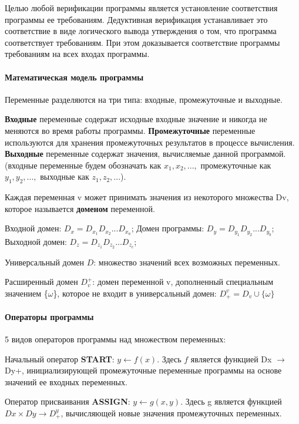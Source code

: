 
Целью любой верификации программы является установление соответствия программы ее требованиям. Дедуктивная верификация устанавливает это соответствие в виде логического вывода утверждения о том, что программа соответствует требованиям. При этом доказывается соответствие программы требованиям на всех входах программы.
\paragraph{Математическая модель программы}

Переменные разделяются на три типа: входные, промежуточные и выходные.

\textbf{Входные} переменные содержат исходные входные значение и никогда не меняются во время работы программы. \textbf{Промежуточные} переменные используются для хранения промежуточных результатов в процессе вычисления. \textbf{Выходные} переменные содержат значения, вычисляемые данной программой.(входные переменные будем обозначать как $x_1, x_2, ...,$ промежуточные как $y_1, y_2, ...,$ выходные как $z_1, z_2, ...$).

Каждая переменная v может принимать значения из некоторого множества Dv, которое называется \textbf{доменом} переменной.

Входной домен: $D_x = D_{x_1}  D_{x_2}  ...  D_{x_a}$; Домен программы: $D_y = D_{y_1}  D_{y_2}  ...  D_{y_b}$; Выходной домен: $D_z = D_{z_1}  D_{z_2}  ...  D_{z_c}$; 

Универсальный домен $D$: множество значений всех возможных переменных.

Расширенный домен $D_v^{+}$: домен переменной v, дополненный специальным значением \{$\omega$\}, которое не входит в универсальный домен: $D^v_+ = D_v \cup \{\omega\}$

\paragraph{Операторы программы}
5 видов операторов программы над множеством переменных:

Начальный оператор \textbf{START}: $y \leftarrow f(x)$. Здесь $f$ является функцией Dx $\rightarrow$ Dy+, инициализирующей промежуточные переменные программы на основе значений ее входных переменных.

Оператор присваивания \textbf{ASSIGN}: $y \leftarrow g(x, y)$. Здесь g является функцией $Dx \times Dy \rightarrow D^y_+$, вычисляющей новые значения промежуточных переменных.

